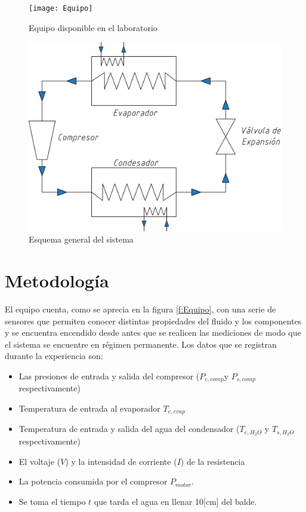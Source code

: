 \documentclass[11pt,letterpaper]{extarticle}        %
\numberwithin{equation}{section}                    %
\begin{document}
\begin{figure}[H]
\begin{minipage}[t]{.45\textwidth}
\centering
\texttt{[image: Equipo]}
\caption{Equipo disponible en el laboratorio}
\label{f:Equipo}
\end{minipage}
\hfill
\begin{minipage}[t]{.5\textwidth}
\centering
\includegraphics[width=\linewidth]{Esquema}
\caption{Esquema general del sistema}
\label{f:Esquema}
\end{minipage}
\end{figure}


\section{Metodología}

El equipo cuenta, como se aprecia en la figura \ref{f:Equipo}, con una serie de sensores que permiten conocer distintas propiedades del fluido y los componentes y se encuentra encendido desde antes que se realicen las mediciones de modo que el sistema se encuentre en régimen permanente. Los datos que se registran durante la experiencia son:

\begin{itemize}
\item Las presiones de entrada y salida del compresor ($P_{e,comp}$y $P_{s,comp}$ respectivamente) 
\item Temperatura de entrada al evaporador $T_{e,evap}$
\item Temperatura de entrada y salida del agua del condensador ($T_{e,H_2O}$ y $T_{s,H_2O}$ respectivamente)
\item El voltaje ($V$) y la intensidad de corriente ($I$) de la resistencia
\item La potencia consumida por el compresor $P_{motor}$.
\item Se toma el tiempo $t$ que tarda el agua en llenar 10[cm] del balde.
\end{itemize}
\end{document}
